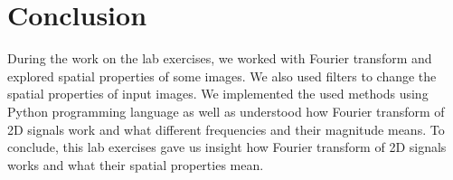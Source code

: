 \documentclass[a4paper]{article}
\begin{document}
\section{Conclusion}
During the work on the lab exercises, we worked with Fourier transform and explored spatial properties of some images. We also used filters to change the spatial properties of input images. We implemented the used methods using Python programming language as well as understood how Fourier transform of 2D signals work and what different frequencies and their magnitude means. To conclude, this lab exercises gave us insight how Fourier transform of 2D signals works and what their spatial properties mean.
\end{document}
